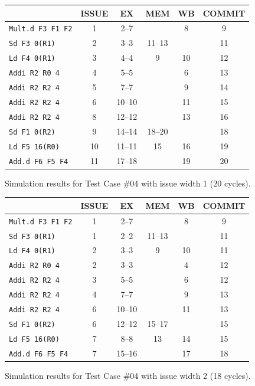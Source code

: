 \documentclass[11pt]{article}
\renewcommand{\_}{\origunderscore\allowbreak}
\begin{document}
\begin{figure}[H]
\centering
\small
\begin{tabular}{lccccc}
\hline
 & ISSUE & EX & MEM & WB & COMMIT \\
\hline
\texttt{Mult.d F3 F1 F2} & 1 & 2--7 &  & 8 & 9 \\
\texttt{Sd F3 0(R1)} & 2 & 3--3 & 11--13 &  & 11 \\
\texttt{Ld F4 0(R1)} & 3 & 4--4 & 9 & 10 & 12 \\
\texttt{Addi R2 R0 4} & 4 & 5--5 &  & 6 & 13 \\
\texttt{Addi R2 R2 4} & 5 & 7--7 &  & 9 & 14 \\
\texttt{Addi R2 R2 4} & 6 & 10--10 &  & 11 & 15 \\
\texttt{Addi R2 R2 4} & 8 & 12--12 &  & 13 & 16 \\
\texttt{Sd F1 0(R2)} & 9 & 14--14 & 18--20 &  & 18 \\
\texttt{Ld F5 16(R0)} & 10 & 11--11 & 15 & 16 & 19 \\
\texttt{Add.d F6 F5 F4} & 11 & 17--18 &  & 19 & 20 \\
\hline
\end{tabular}
\caption{Simulation results for Test Case \#04 with issue width 1 (20 cycles).}
\end{figure}

\begin{figure}[H]
\centering
\small
\begin{tabular}{lccccc}
\hline
 & ISSUE & EX & MEM & WB & COMMIT \\
\hline
\texttt{Mult.d F3 F1 F2} & 1 & 2--7 &  & 8 & 9 \\
\texttt{Sd F3 0(R1)} & 1 & 2--2 & 11--13 &  & 11 \\
\texttt{Ld F4 0(R1)} & 2 & 3--3 & 9 & 10 & 11 \\
\texttt{Addi R2 R0 4} & 2 & 3--3 &  & 4 & 12 \\
\texttt{Addi R2 R2 4} & 3 & 5--5 &  & 6 & 12 \\
\texttt{Addi R2 R2 4} & 4 & 7--7 &  & 9 & 13 \\
\texttt{Addi R2 R2 4} & 6 & 10--10 &  & 11 & 13 \\
\texttt{Sd F1 0(R2)} & 6 & 12--12 & 15--17 &  & 15 \\
\texttt{Ld F5 16(R0)} & 7 & 8--8 & 13 & 14 & 15 \\
\texttt{Add.d F6 F5 F4} & 7 & 15--16 &  & 17 & 18 \\
\hline
\end{tabular}
\caption{Simulation results for Test Case \#04 with issue width 2 (18 cycles).}
\end{figure}
\end{document}
